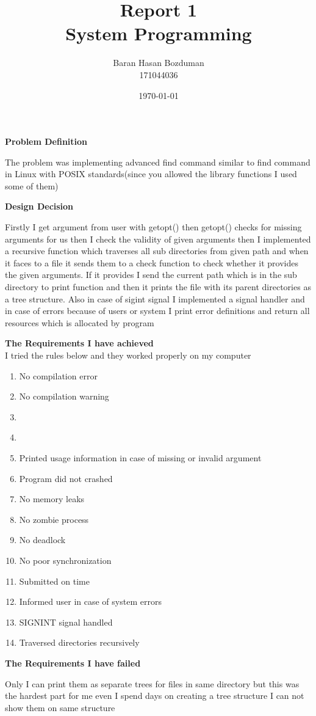 \documentclass{report}
\title{\huge Report 1 \\ \Huge System Programming}
\author{\huge Baran Hasan Bozduman\\ \huge 171044036}
\date{\today}
\begin{document}
\maketitle
{\huge \textbf{Problem Definition} \\}

{\large The problem was implementing advanced find command similar to find command in Linux with POSIX standards(since you allowed the library functions I used some of them) \\}

{\huge \textbf{Design Decision} \\}

{\large Firstly I get argument from user with getopt() then getopt() checks for missing arguments for us then I check the validity of given arguments then I implemented a recursive function which traverses all sub directories from given path and when it faces to a file it sends them to a check function to check whether it provides the given arguments. If it provides I send the current path which is in the sub directory to print function and then it prints the file with its parent directories as a tree structure. Also in case of sigint signal I implemented a signal handler and in case of errors because of users or system I print error definitions and return all resources which is allocated by program \\}

{\huge \textbf{The Requirements I have achieved} \\}
 {\large I tried the rules below and they worked properly on my computer}
\begin{enumerate}
    \item {\large No compilation error }
    \item {\large No compilation warning}
    \item {\large {} }
    \item {\large {}}
    \item {\large Printed usage information in case of missing or invalid argument}
    \item {\large Program did not crashed}
    \item {\large No memory leaks}
    \item {\large No zombie process}
    \item {\large No deadlock}
    \item {\large No poor synchronization}
    \item {\large Submitted on time}
    \item {\large Informed user in case of system errors}
    \item {\large SIGNINT signal handled}
    \item {\large Traversed directories recursively}
    
\end{enumerate}

{\huge \textbf{The Requirements I have failed} \\}

{\large Only I can print them as separate trees for files in same directory but this was the hardest part for me even I spend days on creating a tree structure I can not show them on same structure \\}
\end{document}
